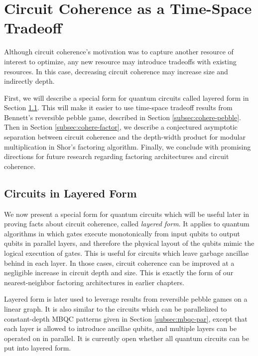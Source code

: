 \section{Circuit Coherence as a Time-Space Tradeoff}
\label{sec:cohere-tradeoff}

Although circuit coherence's motivation was to capture another resource
of interest to optimize, any new resource may introduce tradeoffs with
existing resources. In this case, decreasing circuit coherence
may increase size and indirectly depth.

First, we will describe a special form for quantum circuits called
layered form in Section \ref{subsec:cohere-layer}. This will make
it easier to use time-space tradeoff results from Bennett's
reversible pebble game, described in Section \ref{subsec:cohere-pebble}.
Then in Section \ref{subsec:cohere-factor}, we describe a conjectured asymptotic separation
between circuit coherence and the depth-width product for modular
multiplication in Shor's factoring algorithm. Finally, we conclude with
promising directions for future research regarding factoring architectures
and circuit coherence.

\subsection{Circuits in Layered Form}
\label{subsec:cohere-layer}

We now present a special form for quantum circuits which will be useful
later in proving facts about circuit coherence, called \emph{layered form}.
It applies to quantum algorithms in which gates execute
monotonically from input qubits to output qubits in parallel layers,
and therefore the physical layout of the qubits mimic the logical
execution of gates. This is useful for circuits which leave
garbage ancillae behind in each layer. In those cases,
circuit coherence can be improved at a negligible increase
in circuit depth and size. This is exactly the form of our
nearest-neighbor factoring architectures in earlier chapters.

Layered form is later used to leverage
results from reversible pebble games on a linear graph. It is also
similar to the circuits which can be parallelized to
constant-depth
MBQC patterns given in Section \ref{subsec:mbqc-par}, except that
each layer is allowed to introduce ancillae qubits, and multiple layers
can be operated on in parallel.
It is currently open whether
all quantum circuits can be put into layered form.

